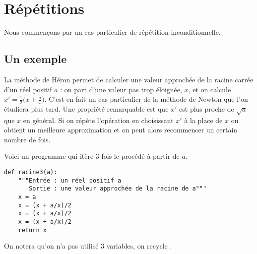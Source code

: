 \section{Répétitions}
Nous commençons par un cas particulier de répétition inconditionnelle.
\subsection{Un exemple}
La méthode de Héron permet de calculer une valeur approchée de la racine carrée d'un réel positif $a$ : on part d'une valeur pas trop éloignée, $x$, et on calcule $x'=\frac 12 \bigl(x + \frac ax\bigr)$. C'est en fait un cas particulier de la méthode de Newton que l'on étudiera plus tard. Une propriété remarquable est que $x'$ est plus proche de $\sqrt a$ que $x$ en général. Si on répète l'opération en choisissant $x'$ à la place de $x$ on obtient un meilleure approximation et on peut alors recommencer un certain nombre de fois.

\newpage

Voici un programme qui itère 3 fois le procédé à partir de $a$.
\begin{lstlisting}
def racine3(a):
    """Entrée : un réel positif a
       Sortie : une valeur approchée de la racine de a"""
    x = a
    x = (x + a/x)/2
    x = (x + a/x)/2
    x = (x + a/x)/2
    return x
\end{lstlisting}
On notera qu'on n'a pas utilisé 3 variables, on recycle .

\medskip

